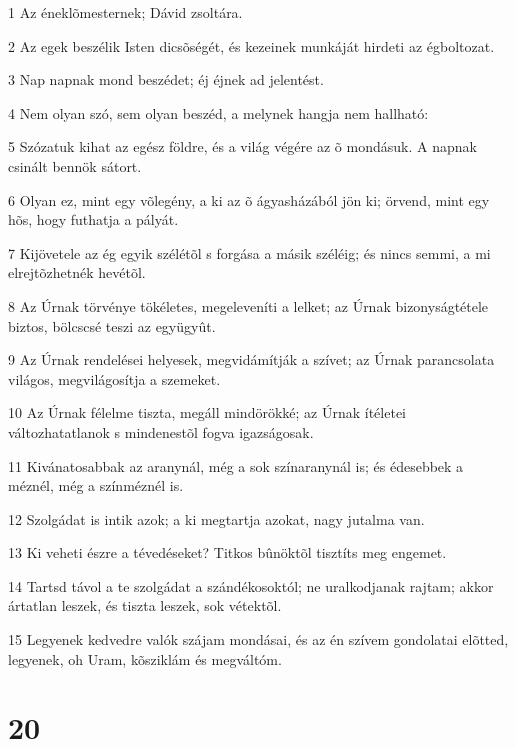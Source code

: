 \par 1 Az éneklõmesternek; Dávid zsoltára.
\par 2 Az egek beszélik Isten dicsõségét, és kezeinek munkáját hirdeti az égboltozat.
\par 3 Nap napnak mond beszédet; éj éjnek ad jelentést.
\par 4 Nem olyan szó, sem olyan beszéd, a melynek hangja nem hallható:
\par 5 Szózatuk kihat az egész földre, és a világ végére az õ mondásuk. A napnak csinált bennök sátort.
\par 6 Olyan ez, mint egy võlegény, a ki az õ ágyasházából jön ki; örvend, mint egy hõs, hogy futhatja a pályát.
\par 7 Kijövetele az ég egyik szélétõl s forgása a másik széléig; és nincs semmi, a mi elrejtõzhetnék hevétõl.
\par 8 Az Úrnak törvénye tökéletes, megeleveníti a lelket; az Úrnak bizonyságtétele biztos, bölcscsé teszi az együgyût.
\par 9 Az Úrnak rendelései helyesek, megvidámítják a szívet; az Úrnak parancsolata világos, megvilágosítja a szemeket.
\par 10 Az Úrnak félelme tiszta, megáll mindörökké; az Úrnak ítéletei változhatatlanok s mindenestõl fogva igazságosak.
\par 11 Kivánatosabbak az aranynál, még a sok színaranynál is; és édesebbek a méznél, még a színméznél is.
\par 12 Szolgádat is intik azok; a ki megtartja azokat, nagy jutalma van.
\par 13 Ki veheti észre a tévedéseket? Titkos bûnöktõl tisztíts meg engemet.
\par 14 Tartsd távol a te szolgádat a szándékosoktól; ne uralkodjanak rajtam; akkor ártatlan leszek, és tiszta leszek, sok vétektõl.
\par 15 Legyenek kedvedre valók szájam mondásai, és az én szívem gondolatai elõtted, legyenek, oh Uram, kõsziklám és megváltóm.

\chapter{20}

